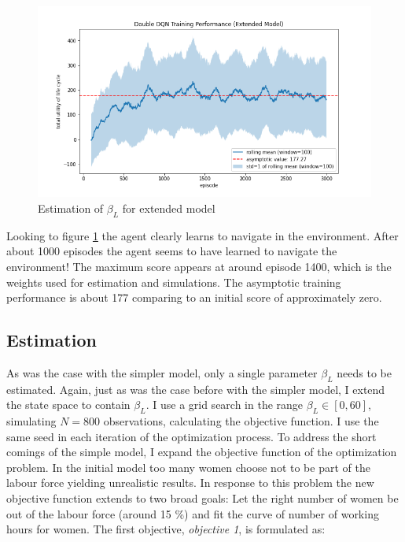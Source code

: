 \begin{figure}[ht]
    \centering
    \includegraphics[scale=0.4]{figures/ddqn_extended_model_training_performance.png}
    \caption{Estimation of $\beta_L$ for extended model}
    \label{fig:training_extended}
\end{figure}

Looking to figure \ref{fig:training_extended} the agent clearly learns to navigate in the environment. After about 1000 episodes the agent seems to have learned to navigate the environment! The maximum score appears at around episode 1400, which is the weights used for estimation and simulations. The asymptotic training performance is about 177 comparing to an initial score of approximately zero.

\subsection{Estimation}

As was the case with the simpler model, only a single parameter $\beta_L$ needs to be estimated. Again, just as was the case before with the simpler model, I extend the state space to contain $\beta_L$. I use a grid search in the range $\beta_L \in [0, 60]$, simulating $N=800$ observations, calculating the objective function. I use the same seed in each iteration of the optimization process. To address the short comings of the simple model, I expand the objective function of the optimization problem. In the initial model too many women choose not to be part of the labour force yielding unrealistic results. In response to this problem the new objective function extends to two broad goals: Let the right number of women be out of the labour force (around 15 \%) and fit the curve of number of working hours for women. The first objective, \textit{objective 1}, is formulated as: 

